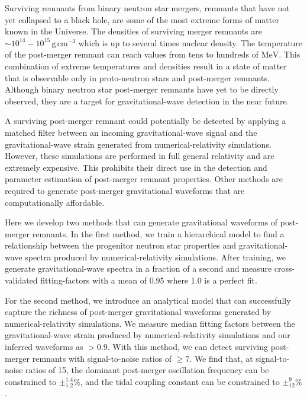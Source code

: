 \documentclass[../Thesis.tex]{subfiles}
\begin{document}
    Surviving remnants from binary neutron star mergers, remnants that have not yet collapsed to a black hole,  are some of the most extreme forms of matter known in the Universe.    
    The densities of surviving merger remnants are $\sim 10^{14}-10^{15}\,\mathrm{g\, cm^{-3}}$ which is up to several times nuclear density.
    The temperature of the post-merger remnant can reach values from tens to hundreds of $\mathrm{MeV}$.
    This combination of extreme temperatures and densities result in a state of matter that is observable only in proto-neutron stars and post-merger remnants.
    Although binary neutron star post-merger remnants have yet to be directly observed, they are a target for gravitational-wave detection in the near future. \par

    A surviving post-merger remnant could potentially be detected by applying a matched filter between an incoming gravitational-wave signal and the gravitational-wave strain generated from numerical-relativity simulations.
    However, these simulations are performed in full general relativity and are extremely expensive.
    This prohibits their direct use in the detection and parameter estimation of post-merger remnant properties.
    Other methods are required to generate post-merger gravitational waveforms that are computationally affordable. \par
    
    Here we develop two methods that can generate gravitational waveforms of post-merger remnants.
    In the first method, we train a hierarchical model to find a relationship between the progenitor neutron star properties and gravitational-wave spectra produced by numerical-relativity simulations.
    After training, we generate gravitational-wave spectra in a fraction of a second and measure cross-validated fitting-factors with a mean of 0.95 where 1.0 is a perfect fit.\par
    
    For the second method, we introduce an analytical model that can successfully capture the richness of post-merger gravitational waveforms generated by numerical-relativity simulations.
    We measure median fitting factors between the gravitational-wave strain produced by numerical-relativity simulations and our inferred waveforms as $> 0.9$.
    With this method, we can detect surviving post-merger remnants with signal-to-noise ratios of $\geqslant 7$.
    We find that, at signal-to-noise ratios of 15, the dominant post-merger oscillation frequency can be constrained to $\pm_{1.2}^{1.4}\%$, and the tidal coupling constant can be constrained to $\pm^{9}_{12}\%$. \par
\end{document}
